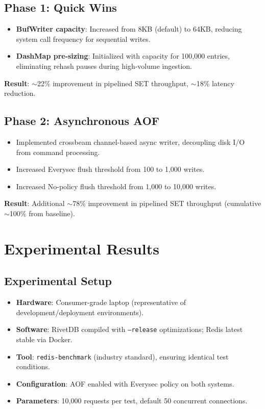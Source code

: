 \documentclass[conference,a4paper]{IEEEtran}
\begin{document}
\subsection{Phase 1: Quick Wins}

\begin{itemize}
    \item \textbf{BufWriter capacity}: Increased from 8KB (default) to 64KB, reducing system call frequency for sequential writes.
    \item \textbf{DashMap pre-sizing}: Initialized with capacity for 100,000 entries, eliminating rehash pauses during high-volume ingestion.
\end{itemize}

\textbf{Result}: $\sim$22\% improvement in pipelined SET throughput, $\sim$18\% latency reduction.

\subsection{Phase 2: Asynchronous AOF}

\begin{itemize}
    \item Implemented crossbeam channel-based async writer, decoupling disk I/O from command processing.
    \item Increased Everysec flush threshold from 100 to 1,000 writes.
    \item Increased No-policy flush threshold from 1,000 to 10,000 writes.
\end{itemize}

\textbf{Result}: Additional $\sim$78\% improvement in pipelined SET throughput (cumulative $\sim$100\% from baseline).

\section{Experimental Results}

\subsection{Experimental Setup}

\begin{itemize}
    \item \textbf{Hardware}: Consumer-grade laptop (representative of development/deployment environments).
    \item \textbf{Software}: RivetDB compiled with \texttt{--release} optimizations; Redis latest stable via Docker.
    \item \textbf{Tool}: \texttt{redis-benchmark} (industry standard), ensuring identical test conditions.
    \item \textbf{Configuration}: AOF enabled with Everysec policy on both systems.
    \item \textbf{Parameters}: 10,000 requests per test, default 50 concurrent connections.
\end{itemize}
\end{document}
